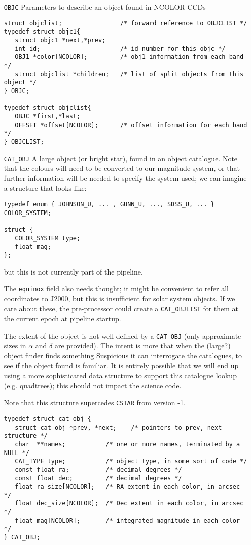 {\begin{itemize}
\begin{verbatim}
typedef struct obj1list {
   OBJ1 *first,*last;
} OBJ1LIST;
\end{verbatim}

\item[{\tt OBJC}]
Parameters to describe an object found in NCOLOR CCDs

\begin{verbatim}
struct objclist;                /* forward reference to OBJCLIST */
typedef struct objc1{
   struct objc1 *next,*prev;
   int id;                      /* id number for this objc */
   OBJ1 *color[NCOLOR];         /* obj1 information from each band */
   struct objclist *children;   /* list of split objects from this object */
} OBJC;

typedef struct objclist{
   OBJC *first,*last;
   OFFSET *offset[NCOLOR];      /* offset information for each band */
} OBJCLIST;
\end{verbatim}

\item[{\tt CAT\_OBJ}]
A large object (or bright star), found in an object catalogue.
Note that the colours will
need to be converted to our magnitude system, or that further information will
be needed to specify the system used; we can imagine a structure that looks
like:
\begin{verbatim}
typedef enum { JOHNSON_U, ... , GUNN_U, ..., SDSS_U, ... } COLOR_SYSTEM;

struct {
   COLOR_SYSTEM type;
   float mag;
};
\end{verbatim}
but this is not currently part of the pipeline.

The {\tt equinox} field also needs thought; it might be convenient to
refer all coordinates to J2000,
but this is insufficient for solar system objects. If we care about these,
the pre-processor could create a {\tt CAT\_OBJLIST} for them at the current
epoch at pipeline startup.

The extent of the object is not well defined by a {\tt CAT\_OBJ} (only
approximate sizes in $\alpha$ and $\delta$ are provided). The intent is
more that when the (large?) object finder finds something Suspicious it
can interrogate the catalogues, to see if the object found is familiar.
It is entirely possible that we will end up using a more sophisticated
data structure to support this catalogue lookup (e.g. quadtrees); this
should not impact the science code.

Note that this structure supercedes {\tt CSTAR} from version -1.

\begin{verbatim}
typedef struct cat_obj {
   struct cat_obj *prev, *next;    /* pointers to prev, next structure */
   char  **names;           /* one or more names, terminated by a NULL */
   CAT_TYPE type;           /* object type, in some sort of code */
   const float ra;          /* decimal degrees */
   const float dec;         /* decimal degrees */
   float ra_size[NCOLOR];   /* RA extent in each color, in arcsec */
   float dec_size[NCOLOR];  /* Dec extent in each color, in arcsec */
   float mag[NCOLOR];       /* integrated magnitude in each color */
} CAT_OBJ;


\end{verbatim}
\end{itemize}}
